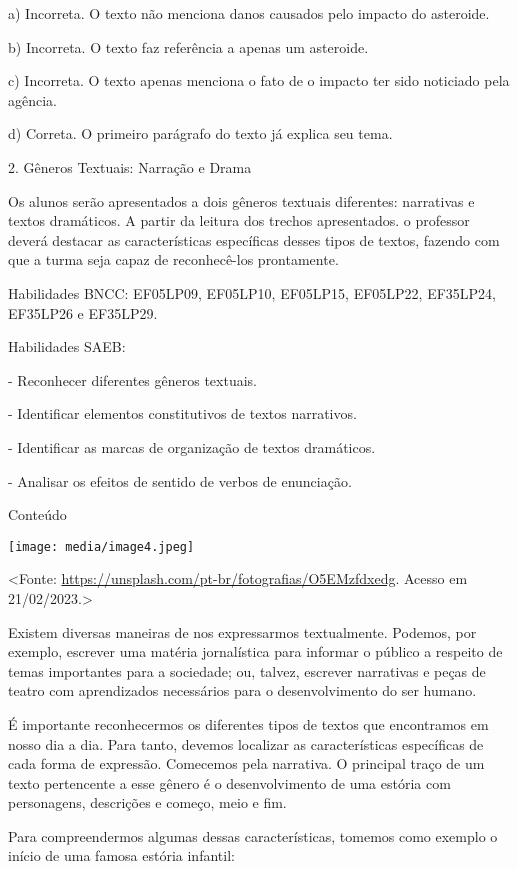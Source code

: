 a) Incorreta. O texto não menciona danos causados pelo impacto do
asteroide.

b) Incorreta. O texto faz referência a apenas um asteroide.

c) Incorreta. O texto apenas menciona o fato de o impacto ter sido
noticiado pela agência.

d) Correta. O primeiro parágrafo do texto já explica seu tema.

2. Gêneros Textuais: Narração e Drama

Os alunos serão apresentados a dois gêneros textuais diferentes:
narrativas e textos dramáticos. A partir da leitura dos trechos
apresentados. o professor deverá destacar as características específicas
desses tipos de textos, fazendo com que a turma seja capaz de
reconhecê-los prontamente.

Habilidades BNCC: EF05LP09, EF05LP10, EF05LP15, EF05LP22, EF35LP24,
EF35LP26 e EF35LP29.

Habilidades SAEB:

- Reconhecer diferentes gêneros textuais.

- Identificar elementos constitutivos de textos narrativos.

- Identificar as marcas de organização de textos dramáticos.

- Analisar os efeitos de sentido de verbos de enunciação.

Conteúdo

\texttt{[image: media/image4.jpeg]}

\textless{}Fonte:
\url{https://unsplash.com/pt-br/fotografias/O5EMzfdxedg}. Acesso em
21/02/2023.\textgreater{}

Existem diversas maneiras de nos expressarmos textualmente. Podemos, por
exemplo, escrever uma matéria jornalística para informar o público a
respeito de temas importantes para a sociedade; ou, talvez, escrever
narrativas e peças de teatro com aprendizados necessários para o
desenvolvimento do ser humano.

É importante reconhecermos os diferentes tipos de textos que encontramos
em nosso dia a dia. Para tanto, devemos localizar as características
específicas de cada forma de expressão. Comecemos pela narrativa. O
principal traço de um texto pertencente a esse gênero é o
desenvolvimento de uma estória com personagens, descrições e começo,
meio e fim.

Para compreendermos algumas dessas características, tomemos como exemplo
o início de uma famosa estória infantil:

